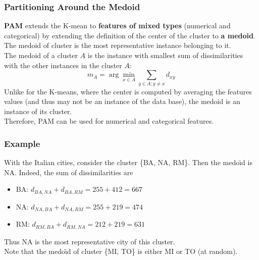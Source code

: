 \begin{frame}
\frametitle{Partitioning Around the Medoid}
{\bf PAM} extends the K-mean to {\bf features of mixed types} (numerical and categorical) by extending the definition of the center of the cluster to {\bf a medoid}.\\
\vspace{0.3cm} 
The medoid of cluster is the most representative instance belonging to it.\\
\vspace{0.3cm}
The medoid of a cluster $A$ is the instance with smallest sum of dissimilarities with the other instances in the cluster $A$:
$$
m_A = \arg \min_{x \in A} \sum_{y\in A; y\neq x} d_{xy}
$$
Unlike for the K-means, where the center is computed by averaging the features values (and thus may not be an instance of the data base), the medoid is an instance of its cluster.\\ 
\vspace{0.3cm}
Therefore, PAM can be used for numerical and categorical features.
\end{frame}
\begin{frame}
\frametitle{Example}
With the Italian cities, consider the cluster \{BA, NA, RM\}. Then the medo{\"\i}d is NA. Indeed, the sum of dissimilarities are
\begin{itemize}
\item BA: $d_{BA,NA}+d_{BA,RM} = 255+412=667$
\item NA: $d_{NA,BA}+d_{NA,RM} = 255+219=474$
\item RM: $d_{RM,BA}+d_{RM,NA} = 212+219=631$
\end{itemize}
Thus NA is the most representative city of this cluster. \\
\vspace{0.3cm}
Note that the medo{\"\i}d of cluster \{MI, TO\} is either MI or TO (at random). 
\end{frame}
